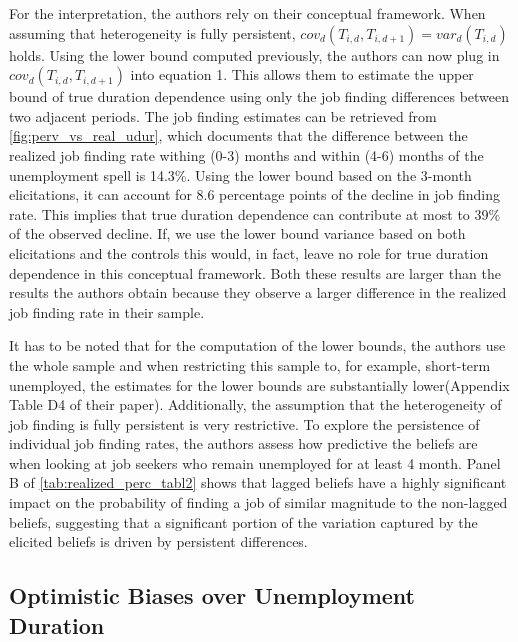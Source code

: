 \documentclass[11pt,a4paper,leqno]{article}
\begin{document}
For the interpretation, the authors rely on their conceptual framework. When assuming that heterogeneity is fully persistent, $cov_d (T_{i,d},T_{i,d+1}) = var_d (T_{i,d})$ holds. Using the lower bound computed previously, the authors can now plug in $cov_d (T_{i,d},T_{i,d+1})$ into equation 1. This allows them to estimate the upper bound of true duration dependence using only the job finding differences between two adjacent periods. The job finding estimates can be retrieved from \autoref{fig:perv_vs_real_udur}, which documents that the difference between the realized job finding rate withing (0-3) months and within (4-6) months of the unemployment spell is 14.3\%. Using the lower bound based on the 3-month elicitations, it can account for 8.6 percentage points of the decline in job finding rate. This implies that true duration dependence can contribute at most to 39\% of the observed decline. If, we use the lower bound variance based on both elicitations and the controls this would, in fact, leave no role for true duration dependence in this conceptual framework. Both these results are larger than the results the authors obtain because they observe a larger difference in the realized job finding rate in their sample.

\begin{center}
	
\end{center}

It has to be noted that for the computation of the lower bounds, the authors use the whole sample and when restricting this sample to, for example, short-term unemployed, the estimates for the lower bounds are substantially lower(Appendix Table D4 of their paper). Additionally, the assumption that the heterogeneity of job finding is fully persistent is very restrictive. To explore the persistence of individual job finding rates, the authors assess how predictive the beliefs are when looking at job seekers who remain unemployed for at least 4 month. Panel B of \autoref{tab:realized_perc_tabl2} shows that lagged beliefs have a highly significant impact on the probability of finding a job of similar magnitude to the non-lagged beliefs, suggesting that a significant portion of the variation captured by the elicited beliefs is driven by persistent differences.

\subsection*{Optimistic Biases over Unemployment Duration}
\end{document}
